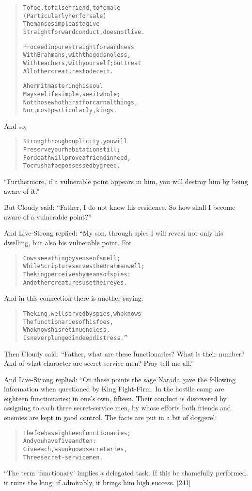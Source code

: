 \documentclass[article, twoside, 14pt]{memoir}
\renewenvironment{verbatim}{%
\begin{quote}%
\vskip -10pt%
\begin{alltt}\normalfont\large}{\end{alltt}%
\end{quote}%
\vskip -10pt
} %
\begin{document}
\begin{verbatim}
To foe, to false friend, to female
(Particularly her for sale)
The man so simple as to give
Straightforward conduct, does not live.

Proceed in pure straightforwardness
With Brahmans, with the gods no less,
With teachers, with yourself; but treat
All other creatures to deceit.

A hermit mastering his soul
May see life simple, see it whole;
Not those who thirst for carnal things,
Nor, most particularly, kings.
\end{verbatim}
And so:

\begin{verbatim}
Strong through duplicity, you will
Preserve your habitation still;
For death will prove a friend in need,
To crush a foe possessed by greed.
\end{verbatim}
``Furthermore, if a vulnerable point appears in him, you will destroy him by being aware of it.''

But Cloudy said:
``Father, I do not know his residence. So how shall I become aware of a vulnerable point?''

And Live-Strong replied: “My son, through spies I will reveal not
only his dwelling, but also his vulnerable point. For

\begin{verbatim}
Cows see a thing by sense of smell;
While Scripture serves the Brahman well;
The king perceives by means of spies:
And other creatures use their eyes.
\end{verbatim}
And in this connection there is another saying:

\begin{verbatim}
The king, well served by spies, who knows
The functionaries of his foes,
Who knows his retinue no less,
Is never plunged in deep distress.”
\end{verbatim}
Then Cloudy said:
``Father, what are these functionaries? What is their number? And of what character are secret-service men? Pray tell me all.''

And Live-Strong replied: “On these points the sage Narada gave the
following information when questioned by King Fight-Firm. In the
hostile camp are eighteen functionaries; in one's own, fifteen.
Their conduct is discovered by assigning to each three
secret-service men, by whose efforts both friends and enemies are
kept in good control. The facts are put in a bit of doggerel:

\begin{verbatim}
The foe has eighteen functionaries;
    And you have five and ten:
Give each, as unknown secretaries,
    Three secret-service men.
\end{verbatim}
“The term `functionary' implies a delegated task. If this be
shamefully performed, it ruins the king; if admirably, it brings
him high success. [241]
\end{document}
